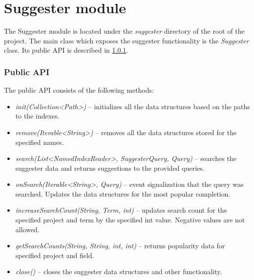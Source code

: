 \section{Suggester module}
The Suggester module is located under the \textit{suggester} directory of the root of the project. The main class which
exposes the suggester functionality is the \textit{Suggester} class. Its public API is described in \ref{public_api}.

\subsubsection{Public API}
\label{public_api}
The public API consists of the following methods:
\begin{itemize}
    \item \textit{init(Collection\textless Path\textgreater)} – initializes all the data structures based on the paths
    to the indexes.
    \item \textit{remove(Iterable\textless String\textgreater)} – removes all the data structures stored for the
    specified names.
    \item \textit{search(List\textless NamedIndexReader\textgreater, SuggesterQuery, Query)} –
    searches the suggester data and returns suggestions to the provided queries.
    \item \textit{onSearch(Iterable\textless String\textgreater, Query)} –
    event signalization that the query was searched. Updates the data structures for the most popular completion.
    \item \textit{increaseSearchCount(String, Term, int)} – updates search count for the specified project and term by the
    specified int value. Negative values are not allowed.
    \item \textit{getSearchCounts(String, String, int, int)} – returns popularity data for specified project and field.
    \item \textit{close()} – closes the suggester data structures and other functionality.
\end{itemize}

